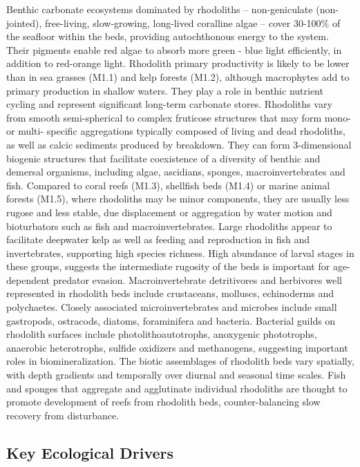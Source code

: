 \documentclass[
  letterpaper,
  DIV=11,
  numbers=noendperiod]{scrartcl}
\begin{document}
Benthic carbonate ecosystems dominated by rhodoliths -- non-geniculate
(non-jointed), free-living, slow-growing, long-lived coralline algae --
cover 30-100\% of the seafloor within the beds, providing autochthonous
energy to the system. Their pigments enable red algae to absorb more
green - blue light efficiently, in addition to red-orange light.
Rhodolith primary productivity is likely to be lower than in sea grasses
(M1.1) and kelp forests (M1.2), although macrophytes add to primary
production in shallow waters. They play a role in benthic nutrient
cycling and represent significant long-term carbonate stores. Rhodoliths
vary from smooth semi-spherical to complex fruticose structures that may
form mono- or multi- specific aggregations typically composed of living
and dead rhodoliths, as well as calcic sediments produced by breakdown.
They can form 3-dimensional biogenic structures that facilitate
coexistence of a diversity of benthic and demersal organisms, including
algae, ascidians, sponges, macroinvertebrates and fish. Compared to
coral reefs (M1.3), shellfish beds (M1.4) or marine animal forests
(M1.5), where rhodoliths may be minor components, they are usually less
rugose and less stable, due displacement or aggregation by water motion
and bioturbators such as fish and macroinvertebrates. Large rhodoliths
appear to facilitate deepwater kelp as well as feeding and reproduction
in fish and invertebrates, supporting high species richness. High
abundance of larval stages in these groups, suggests the intermediate
rugosity of the beds is important for age-dependent predator evasion.
Macroinvertebrate detritivores and herbivores well represented in
rhodolith beds include crustaceans, molluscs, echinoderms and
polychaetes. Closely associated microinvertebrates and microbes include
small gastropods, ostracods, diatoms, foraminifera and bacteria.
Bacterial guilds on rhodolith surfaces include photolithoautotrophs,
anoxygenic phototrophs, anaerobic heterotrophs, sulfide oxidizers and
methanogens, suggesting important roles in biomineralization. The biotic
assemblages of rhodolith beds vary spatially, with depth gradients and
temporally over diurnal and seasonal time scales. Fish and sponges that
aggregate and agglutinate individual rhodoliths are thought to promote
development of reefs from rhodolith beds, counter-balancing slow
recovery from disturbance.

\subsection{Key Ecological Drivers}\label{key-ecological-drivers-26}
\end{document}
